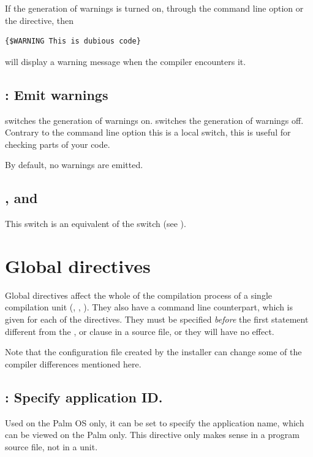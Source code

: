 If the generation of warnings is turned on, through the 
command line option or the  directive, then
\begin{verbatim}
{$WARNING This is dubious code}
\end{verbatim}
will display a warning message when the compiler encounters it.

\subsection{ : Emit warnings}

 switches the generation of warnings on.
 switches the generation of warnings off.
Contrary to the command line option  this
is a local switch, this is useful for checking parts of your code.

By default, no warnings are emitted.

\subsection{,  and }

This switch is an equivalent of the  switch
(see ).

\section{Global directives}
\label{se:GlobalSwitch}
Global directives affect the whole of the compilation process of a single
compilation unit (, , ). They also
have a command line counterpart, which is given for each of the directives.
They must be specified {\em before} the first statement different from the
,  or  clause in a source file, or they
will have no effect.

Note that the configuration file created by the installer can change some of
the compiler differences mentioned here.


\subsection{ : Specify application ID.}
Used on the Palm OS only, it can be set to specify the application name,
which can be viewed on the Palm only. This directive only makes sense in a
program source file, not in a unit.

